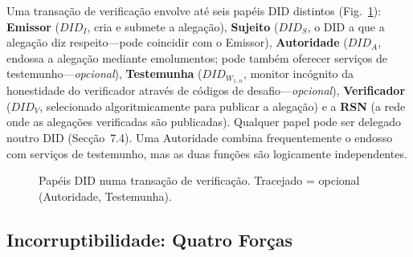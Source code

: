 \documentclass[11pt,a4paper,twocolumn]{article}
\begin{document}
Uma transação de verificação envolve até seis papéis DID distintos (Fig.~\ref{fig:roles}): \textbf{Emissor} ($DID_I$, cria e submete a alegação), \textbf{Sujeito} ($DID_S$, o DID a que a alegação diz respeito---pode coincidir com o Emissor), \textbf{Autoridade} ($DID_A$, endossa a alegação mediante emolumentos; pode também oferecer serviços de testemunho---\emph{opcional}), \textbf{Testemunha} ($DID_{W_{1..n}}$, monitor incógnito da honestidade do verificador através de códigos de desafio---\emph{opcional}), \textbf{Verificador} ($DID_V$, selecionado algoritmicamente para publicar a alegação) e a \textbf{RSN} (a rede onde as alegações verificadas são publicadas). Qualquer papel pode ser delegado noutro DID (Secção~7.4). Uma Autoridade combina frequentemente o endosso com serviços de testemunho, mas as duas funções são logicamente independentes.

\begin{figure}[ht]
\centering
{}
\caption{Papéis DID numa transação de verificação. Tracejado = opcional (Autoridade, Testemunha).}
\label{fig:roles}
\end{figure}

\subsection{Incorruptibilidade: Quatro Forças}
\end{document}
